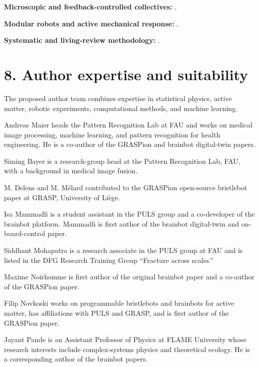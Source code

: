\noindent\textbf{Microscopic and feedback-controlled collectives:}
\cite{Xie2020bioinspiredsoftmic,Pauer2021programmabledesign,Sun2021swarmingmicrodrople,Buerle2020formationofstable,Heuthe2025tunablecolloidalsw}.

\noindent\textbf{Modular robots and active mechanical response:}
\cite{Li2019particleroboticsba,Savoie2019arobotmadeofrobo,Brandenbourger2021limitcyclesturnac,Coulais2025activemetamaterials,Binysh2026moreislessinunpe}.

\noindent\textbf{Systematic and living-review methodology:}
\cite{Page2021prisma,McGowan2016press,Elliott2014living,Elliott2017living,Matl2017vascular,Litjens2017survey,Bayer2017brainshift}.

\section*{8. Author expertise and suitability}

The proposed author team combines expertise in
statistical physics, active matter, robotic
experiments, computational methods, and
machine learning.

Andreas Maier heads the Pattern Recognition
Lab at FAU and works on medical image
processing, machine learning, and pattern
recognition for health engineering. He is
a co-author of the GRASPion and brainbot
digital-twin papers.

Siming Bayer is a research-group head
at the Pattern Recognition Lab, FAU,
with a background in medical image fusion.

M. Delens and M. M\'elard contributed
to the GRASPion open-source bristlebot
paper at GRASP, University of Li\`ege.

Isa Mammadli is a student assistant
in the PULS group and a co-developer
of the brainbot platform. Mammadli
is first author of the brainbot
digital-twin and on-board-control
paper.

Siddhant Mohapatra is a research associate
in the PULS group at FAU and is listed
in the DFG Research Training Group
``Fracture across scales.''

Maxime Noirhomme is first author
of the original brainbot paper
and a co-author of the GRASPion
paper.

Filip Novkoski works on programmable
bristlebots and brainbots for active
matter, has affiliations with PULS
and GRASP, and is first author
of the GRASPion paper.

Jayant Pande is an Assistant Professor
of Physics at FLAME University whose
research interests include complex-systems
physics and theoretical ecology.
He is a corresponding author
of the brainbot papers.

